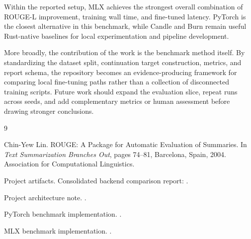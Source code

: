 \documentclass[11pt]{article}
\begin{document}
Within the reported setup, MLX achieves the strongest overall combination of ROUGE-L improvement, training wall time, and fine-tuned latency. PyTorch is the closest alternative in this benchmark, while Candle and Burn remain useful Rust-native baselines for local experimentation and pipeline development.

More broadly, the contribution of the work is the benchmark method itself. By standardizing the dataset split, continuation target construction, metrics, and report schema, the repository becomes an evidence-producing framework for comparing local fine-tuning paths rather than a collection of disconnected training scripts. Future work should expand the evaluation slice, repeat runs across seeds, and add complementary metrics or human assessment before drawing stronger conclusions.

\begin{thebibliography}{9}
\raggedright

Chin-Yew Lin.
\newblock ROUGE: A Package for Automatic Evaluation of Summaries.
\newblock In \emph{Text Summarization Branches Out}, pages 74--81, Barcelona, Spain, 2004. Association for Computational Linguistics.

Project artifacts.
\newblock Consolidated backend comparison report:
\newblock {}.

Project architecture note.
\newblock {}.

PyTorch benchmark implementation.
\newblock {}.

MLX benchmark implementation.
\newblock {}.

\end{thebibliography}
\end{document}
